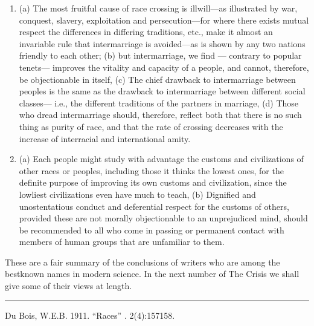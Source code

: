 \documentclass[letterpaper,10pt,english]{jupyterBook}
\begin{document}
\begin{enumerate}
\item {} 
\sphinxAtStartPar
(a) The most fruitful cause of race crossing is ill\sphinxhyphen{}will—as illustrated by war, conquest, slavery, exploitation and persecution—for where there exists mutual respect the differences in differing traditions, etc., make it almost an invariable rule that intermarriage is avoided—as is shown by any two nations friendly to each other; (b) but intermarriage, we find — contrary to popular tenets— improves the vitality and capacity of a people, and cannot, therefore, be objectionable in itself, (c) The chief drawback to intermarriage between peoples is the same as the drawback to intermarriage between different social classes— i.e., the different traditions of the partners in marriage, (d) Those who dread intermarriage should, therefore, reflect both that there is no such thing as purity of race, and that the rate of crossing decreases with the increase of interracial and international amity.

\item {} 
\sphinxAtStartPar
(a) Each people  might study with advantage the customs and civilizations of other races or peoples, including those it thinks the lowest ones, for the definite purpose of improving its own customs and civilization, since the lowliest civilizations even have much to teach, (b) Dignified and unostentatious conduct and deferential respect for the customs of others, provided these are not morally objectionable to an unprejudiced mind, should be recommended to all who come in passing or permanent contact with members of human groups that are unfamiliar to them.

\end{enumerate}

\sphinxAtStartPar
These are a fair summary of the conclusions of writers who are among the best\sphinxhyphen{}known names in modern science. In the next number of The Crisis we shall give some of their views at length.


\bigskip\hrule\bigskip


\sphinxAtStartPar
{} Du Bois, W.E.B. 1911. “Races”  . 2(4):157\sphinxhyphen{}158.
\end{document}
